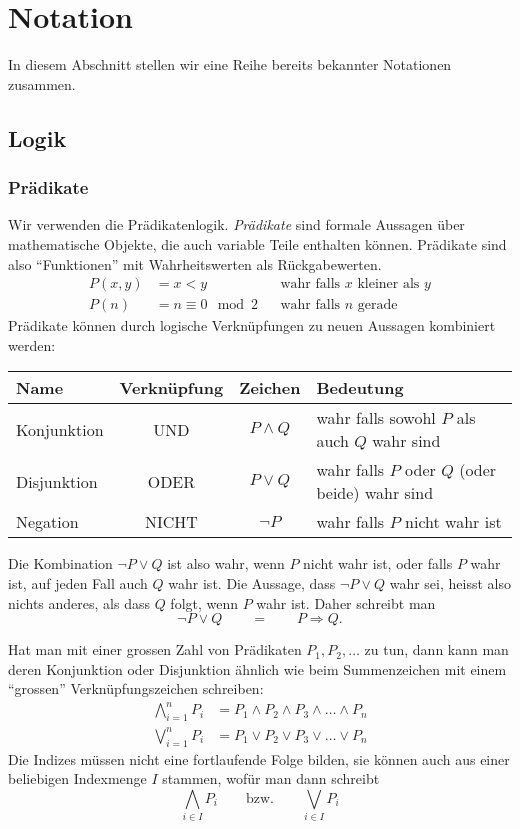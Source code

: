 %
%
%
\section{Notation}
In diesem Abschnitt stellen wir eine Reihe bereits bekannter Notationen
zusammen.
\subsection{Logik}
%
%
\subsubsection{Prädikate}
Wir verwenden die Prädikatenlogik.
%
{\em Prädikate} sind formale Aussagen über mathematische Objekte, die auch
variable Teile enthalten können. Prädikate sind also ``Funktionen'' mit
Wahrheitswerten als Rückgabewerten.
\begin{align*}
P(x,y)&=x < y&&\text{wahr falls $x$ kleiner als $y$}\\
P(n)&=n \equiv 0\mod 2&&\text{wahr falls $n$ gerade}
\end{align*}
Prädikate können durch logische Verknüpfungen zu neuen Aussagen kombiniert
werden:
\begin{center}
\begin{tabular}{|l|c|c|l|}
\hline
Name&Verknüpfung&Zeichen&Bedeutung\\
\hline
\index{Konjunktion}%
Konjunktion&UND&$P\wedge Q$&wahr falls sowohl $P$ als auch $Q$ wahr sind\\
\index{Disjunktion}%
Disjunktion&ODER&$P\vee Q$&wahr falls $P$ oder $Q$ (oder beide) wahr sind\\
\index{Negation}%
Negation&NICHT&$\neg P$&wahr falls $P$ nicht wahr ist\\
\hline
\end{tabular}
\end{center}
Die Kombination $\neg P\vee Q$ ist also wahr, wenn $P$ nicht
wahr ist, oder falls $P$ wahr ist, auf jeden Fall auch $Q$
wahr ist. Die Aussage, dass $\neg P\vee Q$ wahr sei, heisst also
nichts anderes, als dass $Q$ folgt, wenn $P$ wahr ist. Daher schreibt
man
\[
\neg P\vee Q\qquad =\qquad P\Rightarrow Q.
\]

Hat man mit einer grossen Zahl von Prädikaten $P_1,P_2,\dots$ zu tun,
dann kann man deren Konjunktion oder Disjunktion ähnlich wie beim Summenzeichen
mit einem ``grossen'' Verknüpfungszeichen schreiben:
\begin{align*}
\bigwedge_{i=1}^n P_i&=P_1\wedge P_2\wedge P_3\wedge\dots\wedge P_n\\
\bigvee_{i=1}^n P_i&=P_1\vee P_2\vee P_3\vee\dots\vee P_n
\end{align*}
Die Indizes müssen nicht eine fortlaufende Folge bilden, sie können
auch aus einer beliebigen Indexmenge $I$ stammen, wofür man dann
schreibt
\[
\bigwedge_{i\in I}P_i
\qquad
\text{bzw.}
\qquad
\bigvee_{i\in I}P_i
\]

